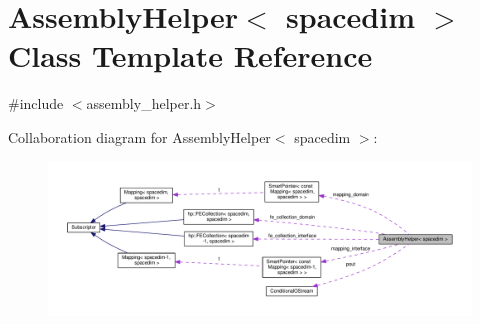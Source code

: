 \hypertarget{class_assembly_helper}{}\section{Assembly\+Helper$<$ spacedim $>$ Class Template Reference}
\label{class_assembly_helper}


{\ttfamily \#include $<$assembly\+\_\+helper.\+h$>$}



Collaboration diagram for Assembly\+Helper$<$ spacedim $>$\+:
\nopagebreak
\begin{figure}[H]
\begin{center}
\leavevmode
\includegraphics[width=350pt]{class_assembly_helper__coll__graph}
\end{center}
\end{figure}
